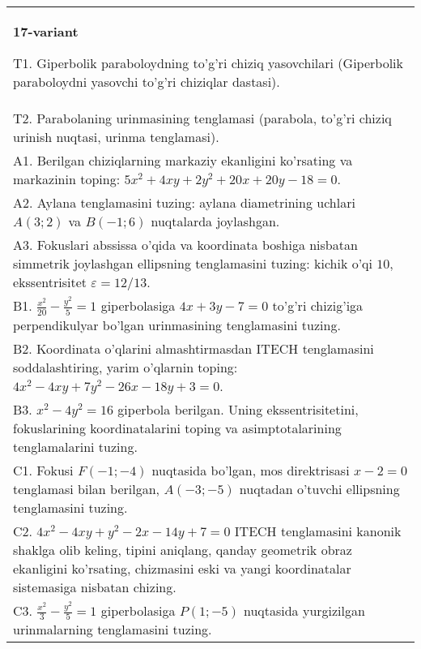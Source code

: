 \documentclass{article}
\begin{document}
\begin{tabular}{m{17cm}}
\textbf{17-variant}
\newline

T1. Giperbolik paraboloydning to'g'ri chiziq yasovchilari (Giperbolik paraboloydni yasovchi to'g'ri chiziqlar dastasi).\\

T2. Parabolaning urinmasining tenglamasi (parabola, to'g'ri chiziq urinish nuqtasi, urinma tenglamasi).\\

A1. Berilgan chiziqlarning markaziy ekanligini ko'rsating va markazinin toping: $5x^{2}+4xy+2y^{2}+20x+20y-18=0$.\\

A2. Aylana tenglamasini tuzing: aylana diametrining uchlari $A(3;2)$ va $B(-1;6)$ nuqtalarda joylashgan.\\

A3. Fokuslari abssissa o'qida va koordinata boshiga nisbatan simmetrik joylashgan ellipsning tenglamasini tuzing: kichik o'qi $10$, ekssentrisitet $\varepsilon=12/13$.\\

B1. $\frac{x^{2}}{20} - \frac{y^{2}}{5} = 1$ giperbolasiga $4x + 3y - 7 = 0$ to'g'ri chizig'iga perpendikulyar bo'lgan urinmasining tenglamasini tuzing.  \\

B2. Koordinata o'qlarini almashtirmasdan ITECH tenglamasini soddalashtiring, yarim o'qlarnin toping: $4x^{2} - 4xy + 7y^{2} - 26x - 18y + 3 = 0$.\\

B3. $x^{2} - 4y^{2} = 16$ giperbola berilgan. Uning ekssentrisitetini, fokuslarining koordinatalarini toping va asimptotalarining tenglamalarini tuzing.\\

C1. Fokusi $F( - 1; - 4)$ nuqtasida bo'lgan, mos direktrisasi $x - 2 = 0$ tenglamasi bilan berilgan, $A( - 3; - 5)$ nuqtadan o'tuvchi ellipsning tenglamasini tuzing.  \\

C2. $4x^{2} - 4xy + y^{2} - 2x - 14y + 7 = 0$ ITECH tenglamasini kanonik shaklga olib keling, tipini aniqlang, qanday geometrik obraz ekanligini ko'rsating, chizmasini eski va yangi koordinatalar sistemasiga nisbatan chizing.  \\

C3. $\frac{x^{2}}{3} - \frac{y^{2}}{5} = 1$ giperbolasiga $P(1; - 5)$ nuqtasida yurgizilgan urinmalarning tenglamasini tuzing.\\

\end{tabular}
\vspace{1cm}
\end{document}
